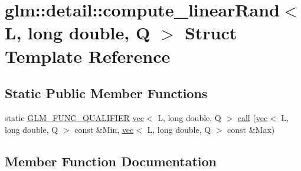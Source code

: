 \hypertarget{structglm_1_1detail_1_1compute__linear_rand_3_01_l_00_01long_01double_00_01_q_01_4}{}\section{glm\+:\+:detail\+:\+:compute\+\_\+linear\+Rand$<$ L, long double, Q $>$ Struct Template Reference}
\label{structglm_1_1detail_1_1compute__linear_rand_3_01_l_00_01long_01double_00_01_q_01_4}
\subsection*{Static Public Member Functions}
\begin{DoxyCompactItemize}
\item 
static \hyperlink{setup_8hpp_a33fdea6f91c5f834105f7415e2a64407}{G\+L\+M\+\_\+\+F\+U\+N\+C\+\_\+\+Q\+U\+A\+L\+I\+F\+I\+ER} \hyperlink{structglm_1_1vec}{vec}$<$ L, long double, Q $>$ \hyperlink{structglm_1_1detail_1_1compute__linear_rand_3_01_l_00_01long_01double_00_01_q_01_4_a9773bef01dd011a5489e8e602553993a}{call} (\hyperlink{structglm_1_1vec}{vec}$<$ L, long double, Q $>$ const \&Min, \hyperlink{structglm_1_1vec}{vec}$<$ L, long double, Q $>$ const \&Max)
\end{DoxyCompactItemize}


\subsection{Member Function Documentation}
\mbox{\label{structglm_1_1detail_1_1compute__linear_rand_3_01_l_00_01long_01double_00_01_q_01_4_a9773bef01dd011a5489e8e602553993a}} 

